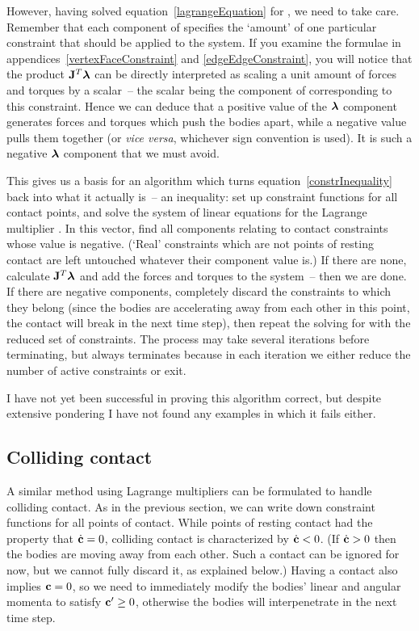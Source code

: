 However, having solved equation~\ref{lagrangeEquation} for \ve{\lambda}, we need to take care.
Remember that each component of \ve{\lambda} specifies the `amount' of one particular constraint
that should be applied to the system. If you examine the formulae in
appendices~\ref{vertexFaceConstraint} and \ref{edgeEdgeConstraint}, you will notice that the
product $\m{J}^T\ve{\lambda}$ can be directly interpreted as scaling a unit amount of forces and
torques by a scalar~-- the scalar being the component of \ve{\lambda} corresponding to this
constraint. Hence we can deduce that a positive value of the $\ve{\lambda}$ component generates
forces and torques which push the bodies apart, while a negative value pulls them together (or
\textsl{vice versa}, whichever sign convention is used). It is such a negative $\ve{\lambda}$
component that we must avoid.

This gives us a basis for an algorithm which turns equation~\ref{constrInequality} back into what
it actually is~-- an inequality: set up constraint functions for all contact points, and solve the
system of linear equations for the Lagrange multiplier \ve{\lambda}. In this vector, find all
components relating to contact constraints whose value is negative. (`Real' constraints which are
not points of resting contact are left untouched whatever their \ve{\lambda} component value is.)
If there are none, calculate $\m{J}^T\ve{\lambda}$ and add the forces and torques to the system~--
then we are done. If there are negative components, completely discard the constraints to which
they belong (since the bodies are accelerating away from each other in this point, the contact
will break in the next time step), then repeat the solving for \ve{\lambda} with the reduced set
of constraints. The process may take several iterations before terminating, but always terminates
because in each iteration we either reduce the number of active constraints or exit.

I have not yet been successful in proving this algorithm correct, but despite extensive pondering
I have not found any examples in which it fails either.

\subsection{Colliding contact\label{collidingContact}}

A similar method using Lagrange multipliers can be formulated to handle colliding contact. As in
the previous section, we can write down constraint functions  for all points of contact.
While points of resting contact had the property that $\dot{\ve{c}} = 0$, colliding contact is
characterized by $\dot{\ve{c}} < 0$. (If $\dot{\ve{c}} > 0$ then the bodies are moving away from
each other. Such a contact can be ignored for now, but we cannot fully discard it, as explained
below.) Having a contact also implies $\ve{c} = 0$, so we need to immediately modify the bodies'
linear and angular momenta to satisfy $\ve{c}' \ge 0$, otherwise the bodies will interpenetrate
in the next time step.

